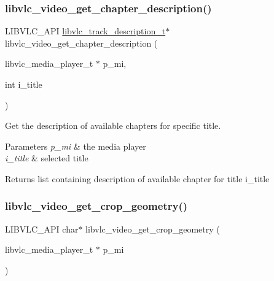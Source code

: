 \subsubsection{\texorpdfstring{libvlc\+\_\+video\+\_\+get\+\_\+chapter\+\_\+description()}{libvlc\_video\_get\_chapter\_description()}}
{\footnotesize\ttfamily L\+I\+B\+V\+L\+C\+\_\+\+A\+PI \hyperlink{structlibvlc__track__description__t}{libvlc\+\_\+track\+\_\+description\+\_\+t}$\ast$ libvlc\+\_\+video\+\_\+get\+\_\+chapter\+\_\+description (\begin{DoxyParamCaption}\item[{libvlc\+\_\+media\+\_\+player\+\_\+t $\ast$}]{p\+\_\+mi,  }\item[{int}]{i\+\_\+title }\end{DoxyParamCaption})}

Get the description of available chapters for specific title.


\begin{DoxyParams}{Parameters}
{\em p\+\_\+mi} & the media player \\
\hline
{\em i\+\_\+title} & selected title \\
\hline
\end{DoxyParams}
\begin{DoxyReturn}{Returns}
list containing description of available chapter for title i\+\_\+title 
\end{DoxyReturn}
\mbox{\label{group__libvlc__video_gab8cd91facb516fd12fec882605a78aa1}} 
\subsubsection{\texorpdfstring{libvlc\+\_\+video\+\_\+get\+\_\+crop\+\_\+geometry()}{libvlc\_video\_get\_crop\_geometry()}}
{\footnotesize\ttfamily L\+I\+B\+V\+L\+C\+\_\+\+A\+PI char$\ast$ libvlc\+\_\+video\+\_\+get\+\_\+crop\+\_\+geometry (\begin{DoxyParamCaption}\item[{libvlc\+\_\+media\+\_\+player\+\_\+t $\ast$}]{p\+\_\+mi }\end{DoxyParamCaption})}

